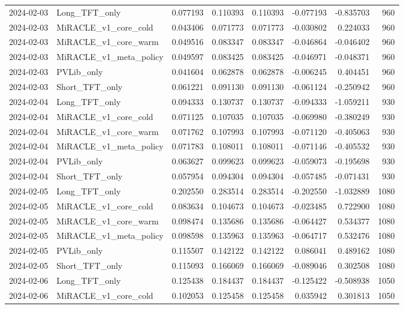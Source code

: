 \begin{tabular}{llrrrrrr}
2024-02-03 & Long_TFT_only & 0.077193 & 0.110393 & 0.110393 & -0.077193 & -0.835703 & 960 \\
2024-02-03 & MiRACLE_v1_core_cold & 0.043406 & 0.071773 & 0.071773 & -0.030802 & 0.224033 & 960 \\
2024-02-03 & MiRACLE_v1_core_warm & 0.049516 & 0.083347 & 0.083347 & -0.046864 & -0.046402 & 960 \\
2024-02-03 & MiRACLE_v1_meta_policy & 0.049597 & 0.083425 & 0.083425 & -0.046971 & -0.048371 & 960 \\
2024-02-03 & PVLib_only & 0.041604 & 0.062878 & 0.062878 & -0.006245 & 0.404451 & 960 \\
2024-02-03 & Short_TFT_only & 0.061221 & 0.091130 & 0.091130 & -0.061124 & -0.250942 & 960 \\
2024-02-04 & Long_TFT_only & 0.094333 & 0.130737 & 0.130737 & -0.094333 & -1.059211 & 930 \\
2024-02-04 & MiRACLE_v1_core_cold & 0.071125 & 0.107035 & 0.107035 & -0.069980 & -0.380249 & 930 \\
2024-02-04 & MiRACLE_v1_core_warm & 0.071762 & 0.107993 & 0.107993 & -0.071120 & -0.405063 & 930 \\
2024-02-04 & MiRACLE_v1_meta_policy & 0.071783 & 0.108011 & 0.108011 & -0.071146 & -0.405532 & 930 \\
2024-02-04 & PVLib_only & 0.063627 & 0.099623 & 0.099623 & -0.059073 & -0.195698 & 930 \\
2024-02-04 & Short_TFT_only & 0.057954 & 0.094304 & 0.094304 & -0.057485 & -0.071431 & 930 \\
2024-02-05 & Long_TFT_only & 0.202550 & 0.283514 & 0.283514 & -0.202550 & -1.032889 & 1080 \\
2024-02-05 & MiRACLE_v1_core_cold & 0.083634 & 0.104673 & 0.104673 & -0.023485 & 0.722900 & 1080 \\
2024-02-05 & MiRACLE_v1_core_warm & 0.098474 & 0.135686 & 0.135686 & -0.064427 & 0.534377 & 1080 \\
2024-02-05 & MiRACLE_v1_meta_policy & 0.098598 & 0.135963 & 0.135963 & -0.064717 & 0.532476 & 1080 \\
2024-02-05 & PVLib_only & 0.115507 & 0.142122 & 0.142122 & 0.086041 & 0.489162 & 1080 \\
2024-02-05 & Short_TFT_only & 0.115093 & 0.166069 & 0.166069 & -0.089046 & 0.302508 & 1080 \\
2024-02-06 & Long_TFT_only & 0.125438 & 0.184437 & 0.184437 & -0.125422 & -0.508938 & 1050 \\
2024-02-06 & MiRACLE_v1_core_cold & 0.102053 & 0.125458 & 0.125458 & 0.035942 & 0.301813 & 1050 \\

\end{tabular}
